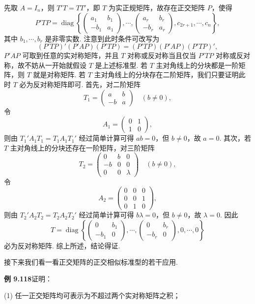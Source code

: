 \documentclass[UTF8,12pt,a4paper,fontset=fandol]{ctexart}
\begin{document}
先取 $A=I_n$，则 $T'T=TT'$，即 $T$ 为实正规矩阵，故存在正交矩阵 $P$，使得
\[
P'TP=\operatorname{diag}\left\{
\begin{pmatrix}
a_1&b_1\\
-b_1&a_1
\end{pmatrix},\cdots,
\begin{pmatrix}
a_r&b_r\\
-b_r&a_r
\end{pmatrix},
c_{2r+1},\cdots,c_n
\right\},
\]
其中 $b_1,\cdots,b_r$ 是非零实数. 注意到此时条件可改写为
\[
(P'TP)'(P'AP)(P'TP)=(P'TP)(P'AP)(P'TP)',
\]
$P'AP$ 可取到任意的实对称矩阵，并且 $T$ 对称或反对称当且仅当 $P'TP$ 对称或反对称，故不妨从一开始就假设 $T$ 是上述标准型. 若 $T$ 主对角线上的分块都是一阶矩阵，则 $T$ 就是对称矩阵. 若 $T$ 主对角线上的分块存在二阶矩阵，我们只要证明此时 $T$ 必为反对称矩阵即可. 首先，对二阶矩阵
\[
T_1=\begin{pmatrix}
a&b\\
-b&a
\end{pmatrix}\quad (b\ne0),
\]
令
\[
A_1=\begin{pmatrix}
0&1\\
1&0
\end{pmatrix},
\]
则由 $T_1'A_1T_1=T_1A_1T_1'$ 经过简单计算可得 $ab=0$，但 $b\ne0$，故 $a=0$. 其次，若 $T$ 主对角线上的分块还存在一阶矩阵，对三阶矩阵
\[
T_2=\begin{pmatrix}
0&b&0\\
-b&0&0\\
0&0&\lambda
\end{pmatrix}\quad (b\ne0),
\]
令
\[
A_2=\begin{pmatrix}
0&0&0\\
0&0&1\\
0&1&0
\end{pmatrix},
\]
则由 $T_2'A_2T_2=T_2A_2T_2'$ 经过简单计算可得 $b\lambda=0$，但 $b\ne0$，故 $\lambda=0$. 因此
\[
T=\operatorname{diag}\left\{
\begin{pmatrix}
0&b_1\\
-b_1&0
\end{pmatrix},\cdots,
\begin{pmatrix}
0&b_r\\
-b_r&0
\end{pmatrix},
0,\cdots,0
\right\}
\]
必为反对称矩阵. 综上所述，结论得证.

接下来我们看一看正交矩阵的正交相似标准型的若干应用.

\noindent\textbf{例 9.118}\quad 证明：

(1) 任一正交矩阵均可表示为不超过两个实对称矩阵之积；
\end{document}
